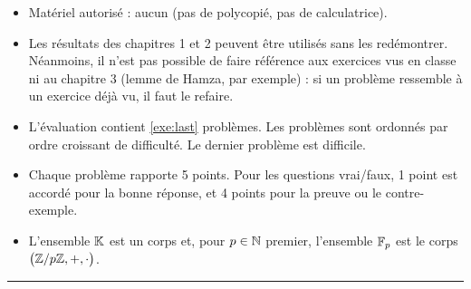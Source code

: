 

\SetDate[6/10/2026]
\reversemarginpar
\setlength{\marginparsep}{.5cm}




\begin{itemize}[label=$\bullet$]
	\item
	Matériel autorisé : aucun (pas de polycopié, pas de calculatrice).
	\item
	Les résultats des chapitres 1 et 2 peuvent être utilisés sans les redémontrer.
	Néanmoins, il n'est pas possible de faire référence aux exercices vus en classe ni au chapitre 3 (lemme de Hamza, par exemple) :
	si un problème ressemble à un exercice déjà vu, il faut le refaire.
	\item
	L'évaluation contient \ref{exe:last} problèmes.
	Les problèmes sont ordonnés par ordre croissant de difficulté. Le dernier problème est difficile.
	\item
	Chaque problème rapporte 5 points.
	Pour les questions vrai/faux, 1 point est accordé pour la bonne réponse, et 4 points pour la preuve ou le contre-exemple.
	\item
	L'ensemble $\mathbb{K}$ est un corps et, pour $p\in\mathbb{N}$ premier, l'ensemble $\mathbb{F}_p$ est le corps $\bigl( \mathbb{Z}/p\mathbb{Z}, +, \cdot \bigr)$.
\end{itemize}

\hrule 









